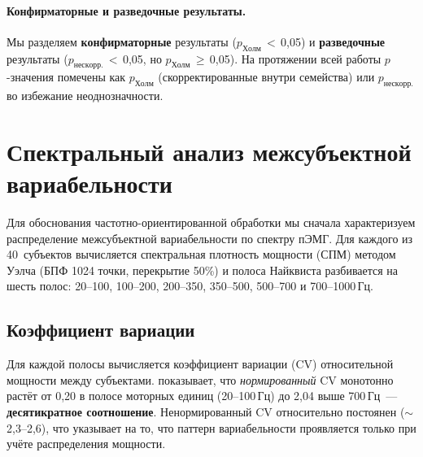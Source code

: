 \documentclass[conference]{IEEEtran}
\begin{document}
\paragraph{Конфирматорные и разведочные результаты.}
Мы разделяем \textbf{конфирматорные} результаты ($p_{\mathrm{Холм}}$\,$<$\,0,05) и \textbf{разведочные} результаты ($p_{\mathrm{нескорр.}}$\,$<$\,0,05, но $p_{\mathrm{Холм}}$\,$\geq$\,0,05).
На протяжении всей работы $p$-значения помечены как $p_{\mathrm{Холм}}$ (скорректированные внутри семейства) или $p_{\mathrm{нескорр.}}$ во избежание неоднозначности.

\section{Спектральный анализ межсубъектной вариабельности}
\label{sec:h1}

Для обоснования частотно-ориентированной обработки мы сначала характеризуем распределение межсубъектной вариабельности по спектру пЭМГ.
Для каждого из 40~субъектов вычисляется спектральная плотность мощности (СПМ) методом Уэлча (БПФ 1024 точки, перекрытие 50\%) и полоса Найквиста разбивается на шесть полос: 20--100, 100--200, 200--350, 350--500, 500--700 и 700--1000\,Гц.

\subsection{Коэффициент вариации}
Для каждой полосы вычисляется коэффициент вариации (CV) относительной мощности между субъектами.
 показывает, что \emph{нормированный} CV монотонно растёт от 0,20 в полосе моторных единиц (20--100\,Гц) до 2,04 выше 700\,Гц~--- \textbf{десятикратное соотношение}.
Ненормированный CV относительно постоянен ($\sim$2,3--2,6), что указывает на то, что паттерн вариабельности проявляется только при учёте распределения мощности.

\begin{table}[t]
\centering
\caption{Межсубъектная вариабельность по частотным полосам (40~субъектов). Норм. CV = CV относительной мощности (мощность в полосе / общая мощность).}
\label{tab:h1_cv}
\end{table}
\end{document}
